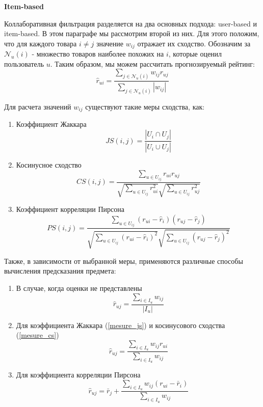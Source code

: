 \textbf{Item-based}

Коллаборативная фильтрация разделяется на два основных подхода: user-based и item-based.
В этом параграфе мы рассмотрим второй из них. Для этого положим, что для каждого
товара $i \neq j$ значение $w_{ij}$ отражает их сходство.
Обозначим за $\mathcal{N}_u(i)$ - множество товаров наиболее похожих на $i$, которые
оценил пользователь $u$. Таким образом, мы можем рассчитать прогнозируемый рейтинг:
\begin{equation}
  \hat{r}_{ui} = \frac{\sum_{j \in \mathcal{N}_u(i)} w_{ij}r_{uj}}{\sum_{j \in \mathcal{N}_u(i)} |w_{ij}|}
\end{equation}

Для расчета значений $w_{ij}$ существуют такие меры сходства, как:
\begin{enumerate}
  \label{mesure}
  \item Коэффициент Жаккара
  \begin{equation}
    \label{mesure_js}
    JS(i,j) = \frac{|U_i \cap U_j|}{|U_i \cup U_j|}
  \end{equation}
  \item Косинусное сходство
  \begin{equation}
    \label{mesure_cs}
    CS(i,j) = \frac{\sum_{u \in U_{ij}} r_{ui}r_{uj}}{\sqrt{\sum_{u \in U_{ij}} r_{ui}^2}\sqrt{\sum_{u \in U_{ij}} r_{uj}^2}}
  \end{equation}
  \item Коэффициент корреляции Пирсона
  \begin{equation}
    \label{mesure_ps}
    PS(i,j) = \frac
      {\sum_{u \in U_{ij}} (r_{ui} - \hat{r}_i)(r_{uj} - \hat{r}_j)}
      {\sqrt{\sum_{u \in U_{ij}} (r_{ui} - \hat{r}_i)^2}\sqrt{\sum_{u \in U_{ij}} (r_{uj} - \hat{r}_j)^2}}
  \end{equation}
\end{enumerate}
Также, в зависимости от выбранной меры, применяются различные способы вычисления
предсказания предмета:
\begin{enumerate}
  \item В случае, когда оценки не представлены
  \begin{equation}
    \hat{r}_{uj} = \frac{\sum_{i \in I_u} w_{ij}}{|I_u|}
  \end{equation}
  \item Для коэффициента Жаккара (\ref{mesure_js}) и косинусового сходства (\ref{mesure_cs})
  \begin{equation}
    \hat{r}_{uj} = \frac{\sum_{i \in I_u} w_{ij} r_{ui} }{\sum_{i \in I_u} w_{ij}}
  \end{equation}
  \item Для коэффициента корреляции Пирсона
  \begin{equation}
    \hat{r}_{uj} = \bar{r}_j + \frac{\sum_{i \in I_u} w_{ij} (r_{ui} - \bar{r}_i) }{\sum_{i \in I_u} w_{ij}}
  \end{equation}

\end{enumerate}

